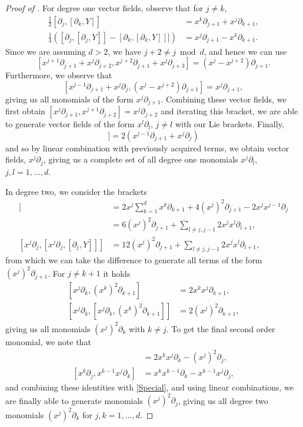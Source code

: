 \documentclass[10pt]{amsart}
\theoremstyle{remark}
\numberwithin{equation}{section}
\begin{document}
\begin{proof}[Proof of ]
For degree one vector fields, observe that for $j \neq k$,
\begin{align}
\frac{1}{2} [\partial_j, [\partial_k, Y]] &=  x^k  \partial_{j+1} + x^j \partial_{k+1} ,\\
\frac{1}{4}([\partial_j, [\partial_j, Y]]-[\partial_k, [\partial_{k}, Y]]]) &=  x^j \partial_{j+1} - x^k \partial_{k+1}.
\end{align}
Since we are assuming $d >2$, we have $j+2 \neq j \bmod d$, and hence we can use
$$[x^{j+1} \partial_{j+1} + x^j \partial_{j+2}, x^{j+2} \partial_{j+1} + x^{j} \partial_{j+3}]  = (x^j  - x^{j+2}) \partial_{j+1}.$$
Furthermore, we observe that
$$[x^{j-1} \partial_{j+1} + x^j \partial_j, (x^j - x^{j+2}) \partial_{j+1}] = x^j \partial_{j+1},$$
giving us all monomials of the form $x^j\partial_{j+1}$. Combining these vector fields, we first obtain $[x^{j} \partial_{j+1}, x^{j+1} \partial_{j+2}] = x^j \partial_{j+2}$ and iterating this bracket, we are able to generate vector fields of the form $x^l \partial_{l}$, $j \neq l$ with our Lie brackets. Finally,
\begin{equation}
[\partial_{j-1}, [\partial_j, Y]] = 2(x^{j-1}\partial_{j+1} + x^j\partial_j)
\end{equation}
and so by linear combination with previously acquired terms, we obtain vector fields, $x^j \partial_{j}$, giving us a complete set of all degree one monomials $x^j\partial_l$, $j,l=1,\dots, d$.

In degree two, we consider the brackets
\begin{align}
[x^j \partial_j, [\partial_j, Y]] &= 2 x^j \sum_{k=1}^d x^k \partial_{k+1} + 4 (x^j)^2 \partial_{j+1} - 2 x^j x^{j-1} \partial_{j} \\
& = 6(x^j)^2 \partial_{j+1} + \sum_{l \neq j, j-1} 2x^j x^l \partial_{l+1} , \\
[x^j \partial_j, [x^j \partial_j, [\partial_j, Y]]] & = 12(x^j)^2 \partial_{j+1} + \sum_{l \neq j, j-1} 2x^j x^l \partial_{l+1} ,
\end{align}
from which we can take the difference to generate all terms of the form $(x^j)^2 \partial_{j+1}$.  For $j \neq k+1$ it holds
\begin{align} \label{Special}
[x^j\partial_k, (x^k)^2\partial_{k+1}] &= 2x^kx^j \partial_{k+1} ,\\
[x^j\partial_k, [x^j\partial_k, (x^k)^2\partial_{k+1}]] &= 2(x^j)^2 \partial_{k+1} ,
\end{align}
giving us all monomials $(x^j)^2 \partial_k$ with $k \neq j$. To get the final second order monomial, we note that
\begin{align}[x^k \partial_j, (x^j)^2 \partial_k] &= 2x^k x^j \partial_k - (x^j)^2 \partial_j, \\
[x^k \partial_{j}, x^{k-1} x^j \partial_k] &= x^k x^{k-1} \partial_k - x^{k-1} x^j \partial_{j} ,
\end{align}
and combining these identities with \eqref{Special}, and using linear combinations, we are finally able to generate monomials $(x^j)^2 \partial_j$, giving us all degree two monomials $(x^j)^2\partial_k$ for $j,k = 1, \dots, d$.


\end{proof}
\end{document}
